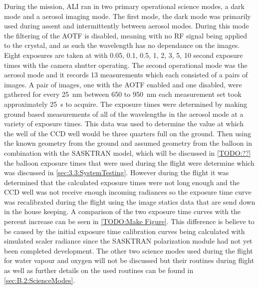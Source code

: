During the mission, ALI ran in two primary operational science modes, a dark mode and a aerosol imaging mode. The first mode, the dark mode was primarily used during assent and intermittently between aerosol modes. During this mode the filtering of the AOTF is disabled, meaning with no RF signal being applied to the crystal, and as such the wavelength has no dependance on the images. Eight exposures are taken at with 0.05, 0.1, 0.5, 1, 2, 3, 5, 10 second exposure times with the camera shutter operating. The second operational mode was the aerosol mode and it records 13 measurements which each consisted of a pairs of images. A pair of images, one with the AOTF enabled and one disabled, were gathered for every 25~nm between 650 to 950~nm each measurement set took approximately 25~s to acquire. The exposure times were determined by making ground based measurements of all of the wavelengths in the aerosol mode at a variety of exposure times. This data was used to determine the value at which the well of the CCD well would be three quarters full on the ground. Then using the known geometry from the ground and assumed geometry from the balloon in combination with the SASKTRAN model, which will be discussed in \autoref{TODO:??} the balloon exposure times that were used during the flight were determine which was discussed in \autoref{sec:3.3:SystemTesting}. However during the flight it was determined that the calculated exposure times were not long enough and the CCD well was not receive enough incoming radiances so the exposure time curve was recalibrated during the flight using the image statics data that are send down in the house keeping. A comparison of the two exposure time curves with the percent increase can be seen in \autoref{TODO:Make Figure}. This difference is believe to be caused by the initial exposure time calibration curves being calculated with simulated scaler radiance since the SASKTRAN polarization module had not yet been completed development. The other two science modes used during the flight for water vapour and oxygen will not be discussed but their routines during flight as well as further details on the used routines can be found in \autoref{sec:B.2:ScienceModes}. %


